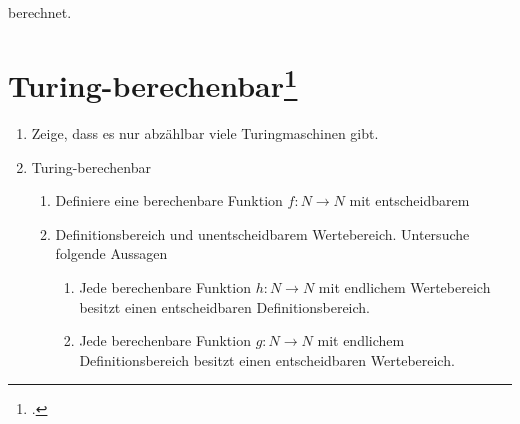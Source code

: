 \documentclass{lehramt-informatik-aufgabe}
\begin{document}
berechnet.

%

\section{Turing-berechenbar\footcite[Seite 29]{theo:fs:4}}

\begin{enumerate}
\item Zeige, dass es nur abzählbar viele Turingmaschinen gibt.

\item Turing-berechenbar

\begin{enumerate}
\item Definiere eine berechenbare Funktion $f: N \rightarrow N$ mit
entscheidbarem

\item Definitionsbereich und unentscheidbarem Wertebereich. Untersuche
folgende Aussagen

\begin{enumerate}

\item Jede berechenbare Funktion $h: N \rightarrow N$ mit endlichem
Wertebereich besitzt einen entscheidbaren Definitionsbereich.

\item Jede berechenbare Funktion $g: N \rightarrow N$ mit endlichem
Definitionsbereich besitzt einen entscheidbaren Wertebereich.
\end{enumerate}
\end{enumerate}
\end{enumerate}
\end{document}
